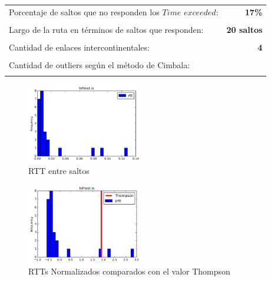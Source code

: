 \begin{center}
\begin{tabular}{p{6.5cm}r}
Porcentaje de saltos que no responden los $Time$ $exceeded$: & \textbf{17\%} \\ \\ 
Largo de la ruta en términos de saltos que responden: &\textbf{20 saltos} \\ \\
Cantidad de enlaces intercontinentales: & \textbf{4} \\ \\
Cantidad de outliers según el método de Cimbala: & \textbf{} \\ \\
\end{tabular}
\end{center}

\begin{figure}[H]
  \centering
    \includegraphics[width=0.45\textwidth]{histogramas_rtt/bifrost-is.png}
  \caption{RTT entre saltos}
  \label{entropia-s}
\end{figure}

\begin{center}

\end{center}

\begin{figure}[H]
  \centering
    \includegraphics[width=0.45\textwidth]{histogramas_thompson/bifrost-is.png}
  \caption{RTTs Normalizados comparados con el valor Thompson}
  \label{entropia-s}
\end{figure}

